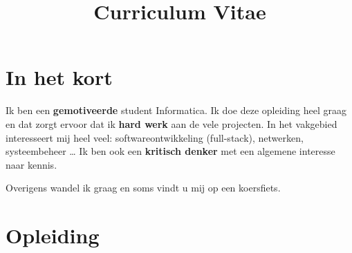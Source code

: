 \documentclass[11pt,a4paper,sans]{moderncv} %
\title{Curriculum Vitae}
\begin{document}




\makecvtitle %


\section{In het kort}
Ik ben een \textbf{gemotiveerde} student Informatica.
Ik doe deze opleiding heel graag en dat zorgt ervoor dat ik \textbf{hard werk} aan de vele projecten.
In het vakgebied interesseert mij heel veel: softwareontwikkeling (full-stack), netwerken, systeembeheer \dots \hspace{2pt}
Ik ben ook een \textbf{kritisch denker} met een algemene interesse naar kennis.

Overigens wandel ik graag en soms vindt u mij op een koersfiets.


\section{Opleiding}
\end{document}
